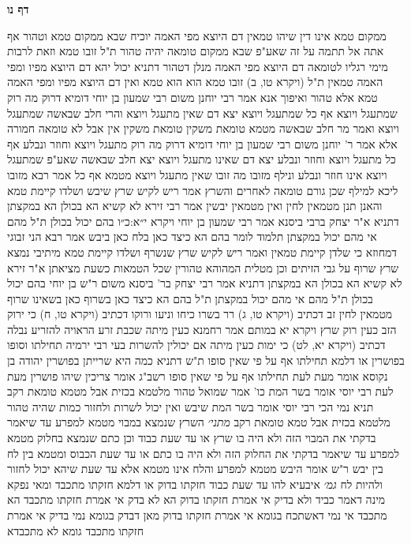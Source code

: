 \documentclass[12pt, openany]{book}
\newcommand{\sethebfont}{
\fontsize{10.5pt}{21.0pt} \selectfont
}
\newcommand{\twocol}[1]{
	{\sethebfont \begin{multicols}{2}
			#1
	\end{multicols}}	
}
\newcommand{\sectname}{}
\newcommand{\newsection}[1]{
	\addcontentsline{toc}{section}{#1}
	\renewcommand{\sectname}{#1}	
	\vspace{-\baselineskip}
	\begin{center}
		\textbf{%
\fontsize{16pt}{16pt}\selectfont
			#1}
	\end{center}
	\vspace{-\baselineskip}
	\nopagebreak
}
\begin{document}
\newsection{דף נו}
\twocol{ממקום טמא אינו דין שיהו טמאין דם היוצא מפי האמה יוכיח שבא ממקום טמא וטהור אף אתה אל תתמה על זה שאע"פ שבא ממקום טומאה יהיה טהור ת"ל זובו טמא וזאת לרבות מימי רגליו לטומאה 
דם היוצא מפי האמה מנלן דטהור דתניא יכול יהא דם היוצא מפיו ומפי האמה טמאין ת"ל (ויקרא טו, ב) זובו טמא הוא הוא טמא ואין דם היוצא מפיו ומפי האמה טמא אלא טהור 
ואיפוך אנא אמר רבי יוחנן משום רבי שמעון בן יוחי דומיא דרוק מה רוק שמתעגל ויוצא אף כל שמתעגל ויוצא יצא דם שאין מתעגל ויוצא 
והרי חלב שבאשה שמתעגל ויוצא ואמר מר חלב שבאשה מטמא טומאת משקין טומאת משקין אין אבל לא טומאה חמורה 
אלא אמר ר' יוחנן משום רבי שמעון בן יוחי דומיא דרוק מה רוק מתעגל ויוצא וחוזר ונבלע אף כל מתעגל ויוצא וחוזר ונבלע יצא דם שאינו מתעגל ויוצא יצא חלב שבאשה שאע"פ שמתעגל ויוצא אינו חוזר ונבלע 
ונילף מזובו מה זובו שאין מתעגל ויוצא מטמא אף כל אמר רבא מזובו ליכא למילף שכן גורם טומאה לאחרים
והשרץ אמר ריש לקיש שרץ שיבש ושלדו קיימת טמא והאנן תנן מטמאין לחין ואין מטמאין יבשין אמר רבי זירא לא קשיא הא בכולן הא במקצתן 
דתניא א"ר יצחק ברבי ביסנא אמר רבי שמעון בן יוחי {ויקרא י״א:כ״ו } בהם יכול בכולן ת"ל מהם 
אי מהם יכול במקצתן תלמוד לומר בהם הא כיצד כאן בלח כאן ביבש 
אמר רבא הני זבוגי דמחוזא כי שלדן קיימת טמאין ואמר ריש לקיש שרץ שנשרף ושלדו קיימת טמא 
מיתיבי נמצא שרץ שרוף על גבי הזיתים וכן מטלית המהוהא טהורין שכל הטמאות כשעת מציאתן א"ר זירא לא קשיא הא בכולן הא במקצתן 
דתניא אמר רבי יצחק בר' ביסנא משום ר"ש בן יוחי בהם יכול בכולן ת"ל מהם 
אי מהם יכול במקצתן ת"ל בהם הא כיצד כאן בשרוף כאן בשאינו שרוף
מטמאין לחין זב דכתיב (ויקרא טו, ג) רר בשרו כיחו וניעו ורוקו דכתיב (ויקרא טו, ח) כי ירוק הזב כעין רוק 
שרץ {ויקרא יא } במותם אמר רחמנא כעין מיתה שכבת זרע הראויה להזריע נבלה דכתיב (ויקרא יא, לט) כי ימות כעין מיתה
אם יכולין להשרות בעי רבי ירמיה תחילתו וסופו בפושרין או דלמא תחילתו אף על פי שאין סופו 
ת"ש דתניא כמה היא שרייתן בפושרין יהודה בן נקוסא אומר מעת לעת תחילתו אף על פי שאין סופו רשב"ג אומר צריכין שיהו פושרין מעת לעת
רבי יוסי אומר בשר המת כו' אמר שמואל טהור מלטמא בכזית אבל מטמא טומאת רקב תניא נמי הכי רבי יוסי אומר בשר המת שיבש ואין יכול לשרות ולחזור כמות שהיה טהור מלטמא בכזית אבל טמא טומאת רקב
{\large\emph{מתני׳}} השרץ שנמצא במבוי מטמא למפרע עד שיאמר בדקתי את המבוי הזה ולא היה בו שרץ או עד שעת כבוד
וכן כתם שנמצא בחלוק מטמא למפרע עד שיאמר בדקתי את החלוק הזה ולא היה בו כתם או עד שעת הכבוס 
ומטמא בין לח בין יבש ר"ש אומר היבש מטמא למפרע והלח אינו מטמא אלא עד שעת שיהא יכול לחזור ולהיות לח
{\large\emph{גמ׳}} איבעיא להו עד שעת כבוד חזקתו בדוק או דלמא חזקתו מתכבד 
ומאי נפקא מינה דאמר כביד ולא בדיק אי אמרת חזקתו בדוק הא לא בדק אי אמרת חזקתו מתכבד הא מתכבד
אי נמי דאשתכח בגומא אי אמרת חזקתו בדוק מאן דבדק בגומא נמי בדיק אי אמרת חזקתו מתכבד גומא לא מתכבדא
}
\end{document}
